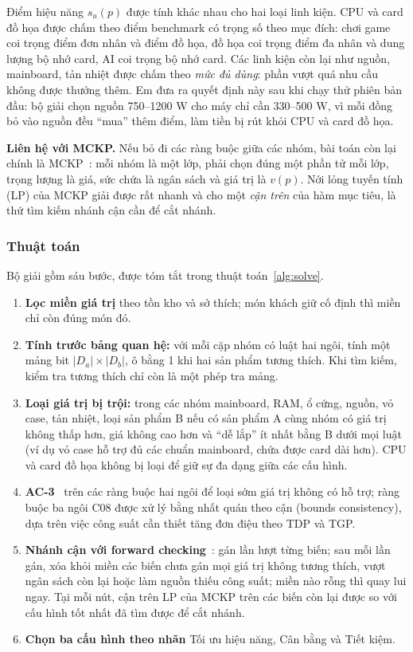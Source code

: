 Điểm hiệu năng $s_u(p)$ được tính khác nhau cho hai loại linh kiện. CPU và card đồ họa được chấm theo điểm benchmark có trọng số theo mục đích: chơi game coi trọng điểm đơn nhân và điểm đồ họa, đồ họa coi trọng điểm đa nhân và dung lượng bộ nhớ card, AI coi trọng bộ nhớ card. Các linh kiện còn lại như nguồn, mainboard, tản nhiệt được chấm theo \emph{mức đủ dùng}: phần vượt quá nhu cầu không được thưởng thêm. Em đưa ra quyết định này sau khi chạy thử phiên bản đầu: bộ giải chọn nguồn 750--1200 W cho máy chỉ cần 330--500 W, vì mỗi đồng bỏ vào nguồn đều ``mua'' thêm điểm, làm tiền bị rút khỏi CPU và card đồ họa.

\textbf{Liên hệ với MCKP.} Nếu bỏ đi các ràng buộc giữa các nhóm, bài toán còn lại chính là MCKP~\cite{knapsack}: mỗi nhóm là một lớp, phải chọn đúng một phần tử mỗi lớp, trọng lượng là giá, sức chứa là ngân sách và giá trị là $v(p)$. Nới lỏng tuyến tính (LP) của MCKP giải được rất nhanh và cho một \emph{cận trên} của hàm mục tiêu, là thứ tìm kiếm nhánh cận cần để cắt nhánh.

\subsubsection{Thuật toán}

Bộ giải gồm sáu bước, được tóm tắt trong thuật toán~\ref{alg:solve}.

\begin{enumerate}
  \item \textbf{Lọc miền giá trị} theo tồn kho và sở thích; món khách giữ cố định thì miền chỉ còn đúng món đó.
  \item \textbf{Tính trước bảng quan hệ:} với mỗi cặp nhóm có luật hai ngôi, tính một mảng bit $|D_a| \times |D_b|$, ô bằng 1 khi hai sản phẩm tương thích. Khi tìm kiếm, kiểm tra tương thích chỉ còn là một phép tra mảng.
  \item \textbf{Loại giá trị bị trội:} trong các nhóm mainboard, RAM, ổ cứng, nguồn, vỏ case, tản nhiệt, loại sản phẩm B nếu có sản phẩm A cùng nhóm có giá trị không thấp hơn, giá không cao hơn và ``dễ lắp'' ít nhất bằng B dưới mọi luật (ví dụ vỏ case hỗ trợ đủ các chuẩn mainboard, chứa được card dài hơn). CPU và card đồ họa không bị loại để giữ sự đa dạng giữa các cấu hình.
  \item \textbf{AC-3}~\cite{mackworth} trên các ràng buộc hai ngôi để loại sớm giá trị không có hỗ trợ; ràng buộc ba ngôi C08 được xử lý bằng nhất quán theo cận (bounds consistency), dựa trên việc công suất cần thiết tăng đơn điệu theo TDP và TGP.
  \item \textbf{Nhánh cận với forward checking}~\cite{haralick}: gán lần lượt từng biến; sau mỗi lần gán, xóa khỏi miền các biến chưa gán mọi giá trị không tương thích, vượt ngân sách còn lại hoặc làm nguồn thiếu công suất; miền nào rỗng thì quay lui ngay. Tại mỗi nút, cận trên LP của MCKP trên các biến còn lại được so với cấu hình tốt nhất đã tìm được để cắt nhánh.
  \item \textbf{Chọn ba cấu hình theo nhãn} Tối ưu hiệu năng, Cân bằng và Tiết kiệm.
\end{enumerate}

